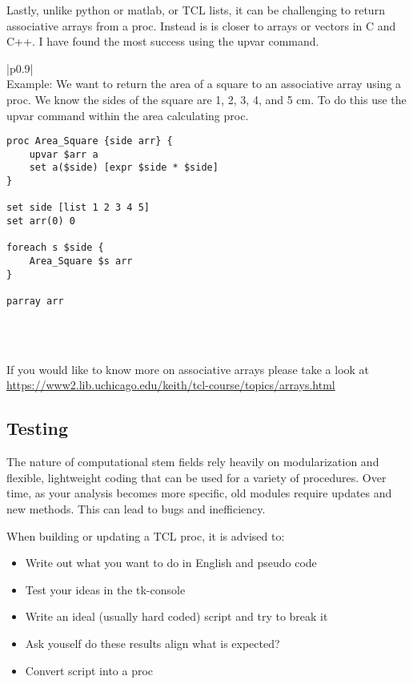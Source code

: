 \documentclass[letter,11pt]{article}
\newenvironment{exercise}
    {\begin{center}
    \begin{tabular}{|p{0.9\textwidth}|}
    \hline\\
    }
    { 
    \\\\\hline
    \end{tabular} 
    \end{center}
    }
\begin{document}
Lastly, unlike python or matlab, or TCL lists, it can be challenging to return associative arrays from a proc. Instead is is closer to arrays or vectors in C and C++. I have found the most success using the upvar command.

\begin{exercise}
Example: We want to return the area of a square to an associative array using a proc. We know the sides of the square are 1, 2, 3, 4, and 5 cm. To do this use the upvar command within the area calculating proc.

\begin{lstlisting}
proc Area_Square {side arr} {
	upvar $arr a
	set a($side) [expr $side * $side] 
}

set side [list 1 2 3 4 5]
set arr(0) 0

foreach s $side {
	Area_Square $s arr
}

parray arr

\end{lstlisting}

\end{exercise}
If you would like to know more on associative arrays please take a look at \url{https://www2.lib.uchicago.edu/keith/tcl-course/topics/arrays.html}

\subsection{Testing}
\label{test}

The nature of computational stem fields rely heavily on modularization and flexible, lightweight coding that can be used for a variety of procedures. Over time, as your analysis becomes more specific, old modules require updates and new methods. This can lead to bugs and inefficiency.

When building or updating a TCL proc, it is advised to:

\begin{itemize}

    \item Write out what you want to do in English and pseudo code
    \item Test your ideas in the tk-console
    \item Write an ideal (usually hard coded) script and try to break it
    \item Ask youself do these results align what is expected?
    \item Convert script into a proc

\end{itemize}
\end{document}

